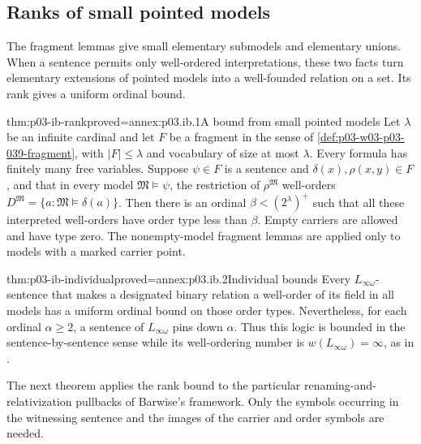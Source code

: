 \subsection{Ranks of small pointed models}
\label{sec:p03-infinitary-boundedness}

The fragment lemmas give small elementary submodels and elementary
unions. When a sentence permits only well-ordered interpretations,
these two facts turn elementary extensions of pointed models into
a well-founded relation on a set. Its rank gives a uniform ordinal
bound.

\begin{hbtheorem}{thm:p03-ib-rank}{proved=annex:p03.ib.1}{A bound from small pointed models}
Let \(\lambda\) be an infinite cardinal and let \(F\) be a fragment
in the sense of \cref{def:p03-w03-p03-039-fragment}, with
\(|F|\leq\lambda\) and vocabulary of size at most \(\lambda\).
Every formula has finitely many free variables. Suppose
\(\psi\in F\) is a sentence and \(\delta(x),\rho(x,y)\in F\),
and that in every model \(\mathfrak M\models\psi\), the restriction
of \(\rho^{\mathfrak M}\) well-orders
\(D^{\mathfrak M}=\{a:\mathfrak M\models\delta(a)\}\).
Then there is an ordinal \(\beta<(2^\lambda)^+\) such that all
these interpreted well-orders have order type less than \(\beta\).
Empty carriers are allowed and have type zero. The nonempty-model
fragment lemmas are applied only to models with a marked carrier
point.
\end{hbtheorem}

\begin{hbcorollary}{thm:p03-ib-individual}{proved=annex:p03.ib.2}{Individual bounds}
Every \(L_{\infty\omega}\)-sentence that makes a designated
binary relation a well-order of its field in all models has a
uniform ordinal bound on those order types. Nevertheless, for each
ordinal \(\alpha\geq2\), a sentence of \(L_{\infty\omega}\)
pins down \(\alpha\). Thus this logic is bounded in the
sentence-by-sentence sense while its well-ordering number is
\(w(L_{\infty\omega})=\infty\), as in
\cite[Ch.~II, Example~5.2.3(e), p.~62]{Ebbinghaus1985ExtendedLogics}.
\end{hbcorollary}

The next theorem applies the rank bound to the particular
renaming-and-relativization pullbacks of Barwise's framework.
Only the symbols occurring in the witnessing sentence and the
images of the carrier and order symbols are needed.
